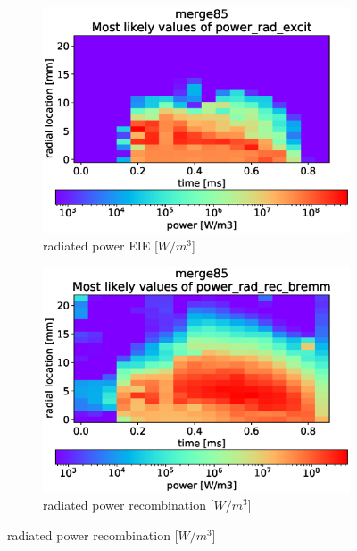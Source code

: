 \begin{figure}[!ht]
	\centering
     \begin{subfigure}{0.48\linewidth}
    	\includegraphics[width=\linewidth,trim={0 30 0 45},clip]{Chapters/chapter3/figs/_merge85_global_fit_example2.eps}
         \caption{radiated power EIE [$W/m^3$]}
        \label{fig:bayes_example_1a}
    \end{subfigure}
    \hfill
    \begin{subfigure}{0.48\linewidth}
    	\includegraphics[width=\linewidth,trim={0 30 0 45},clip]{Chapters/chapter3/figs/_merge85_global_fit_example3.eps}
         \caption{radiated power recombination [$W/m^3$]}

\end{subfigure}
\end{figure}
